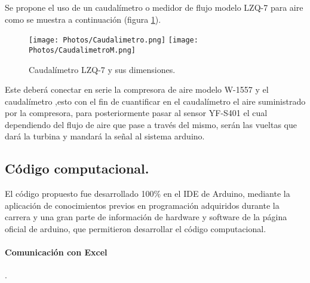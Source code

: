 \documentclass[11pt,letter
								]
								{article}
\begin{document}
 Se propone el uso de un caudalímetro o medidor de flujo  modelo LZQ-7 para aire como se muestra a continuación (figura \ref{19}).

\begin{figure}[H]
\centering
\texttt{[image: Photos/Caudalimetro.png]}
\texttt{[image: Photos/CaudalimetroM.png]}
\caption{Caudalímetro LZQ-7 y sus dimensiones. \cite{LZQ7}}
\label{19}
\end{figure}


 Este  deberá conectar en serie la compresora de aire modelo W-1557 y el caudalímetro 
 ,esto con el fin de cuantificar en el caudalímetro el aire suministrado por la compresora, para posteriormente pasar al sensor YF-S401 el cual dependiendo del flujo de aire que pase a través del mismo, serán las vueltas que dará la turbina y mandará la señal al sistema arduino.\\




\newpage




\subsection{Código computacional.}

El código propuesto fue desarrollado  100\% en el IDE de Arduino, mediante la aplicación de conocimientos previos en programación adquiridos durante la carrera y una gran parte de información de hardware y software de la página oficial de arduino, que permitieron desarrollar el código computacional.%
\paragraph{Comunicación con Excel }.\\
\end{document}
